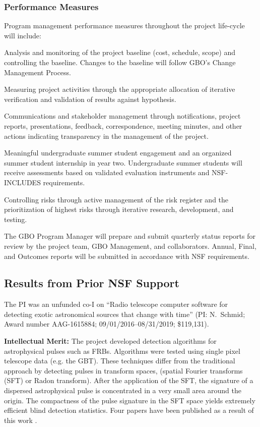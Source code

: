 \documentclass[10pt]{myNSF}
\begin{document}
\subsubsection{Performance Measures}
\label{sec:performance_measures}

Program management performance measures throughout the project
life-cycle will include:
\vspace{-1em}
\begin{itemize*}
\item{Analysis and monitoring of the project baseline (cost, schedule,
  scope) and controlling the baseline.  Changes to the baseline will
  follow GBO's Change Management Process.}
\item{Measuring project activities through the appropriate allocation
  of iterative verification and validation of results against
  hypothesis.}
\item{Communications and stakeholder management through notifications,
  project reports, presentations, feedback, correspondence, meeting
  minutes, and other actions indicating transparency in the management
  of the project.}
\item{Meaningful undergraduate summer student engagement and an
  organized summer student internship in year two. Undergraduate
  summer students will receive assessments based on validated
  evaluation instruments and NSF-INCLUDES requirements.}
\item{Controlling risks through active management of the risk register
  and the prioritization of highest risks through iterative research,
  development, and testing.}
\end{itemize*}
\vspace{-1em}
The GBO Program Manager will prepare and submit quarterly status
reports for review by the project team, GBO Management, and
collaborators. Annual, Final, and Outcomes reports will be submitted
in accordance with NSF requirements.

\subsection{Results from Prior NSF Support}
\label{sec:prior_support}
The PI was an unfunded co-I on ``Radio telescope computer software for
detecting exotic astronomical sources that change with time'' (PI:
N.\ Schmid; Award number AAG-1615884; 09/01/2016--08/31/2019;
\$119,131).

{\bf Intellectual Merit:} The project developed detection algorithms
for astrophysical pulses such as FRBs. Algorithms were tested using
single pixel telescope data (e.g. the GBT).  These techniques differ
from the traditional approach by detecting pulses in transform spaces,
(spatial Fourier transforms (SFT) or Radon transform). After the
application of the SFT, the signature of a dispersed astrophysical
pulse is concentrated in a very small area around the origin. The
compactness of the pulse signature in the SFT space yields extremely
efficient blind detection statistics. Four papers have been published
as a result of this work \cite{asp17,jcs+17,sp18,as18}.
\end{document}
